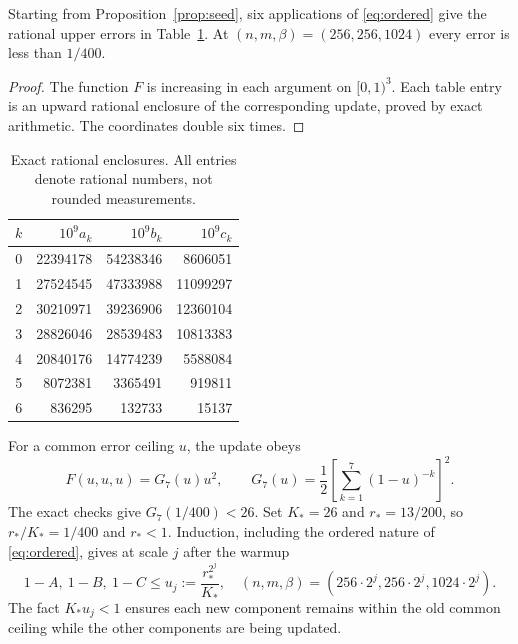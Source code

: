 \begin{proposition}\label{prop:warmup}
Starting from Proposition~\ref{prop:seed}, six applications of \eqref{eq:ordered}
give the rational upper errors in Table~\ref{tab:warmup}. At
$(n,m,\beta)=(256,256,1024)$ every error is less than $1/400$.
\end{proposition}
\begin{proof}
The function $F$ is increasing in each argument on $[0,1)^3$.
Each table entry is an upward rational enclosure of the corresponding update,
proved by exact arithmetic. The coordinates double six times.
\end{proof}
\begin{table}[ht]\centering
\begin{tabular}{r rrr}\toprule
$k$ & $10^9a_k$ & $10^9b_k$ & $10^9c_k$\\\midrule
0&22394178&54238346&8606051\\
1&27524545&47333988&11099297\\
2&30210971&39236906&12360104\\
3&28826046&28539483&10813383\\
4&20840176&14774239&5588084\\
5&8072381&3365491&919811\\
6&836295&132733&15137\\\bottomrule
\end{tabular}
\caption{Exact rational enclosures. All entries denote rational numbers, not rounded measurements.}\label{tab:warmup}
\end{table}

For a common error ceiling $u$, the update obeys
\[
 F(u,u,u)=G_7(u)u^2,\qquad
 G_7(u)=\frac12\left[\sum_{k=1}^7(1-u)^{-k}\right]^2.
\]
The exact checks give $G_7(1/400)<26$. Set $K_*=26$ and $r_*=13/200$,
so $r_*/K_*=1/400$ and $r_*<1$. Induction, including the ordered nature of
\eqref{eq:ordered}, gives at scale $j$ after the warmup
\begin{equation}\label{eq:dyadic}
 1-A,\ 1-B,\ 1-C\le u_j:=\frac{r_*^{2^j}}{K_*},
 \quad (n,m,\beta)=(256\cdot2^j,256\cdot2^j,1024\cdot2^j).
\end{equation}
The fact $K_*u_j<1$ ensures each new component remains within the old common
ceiling while the other components are being updated.

